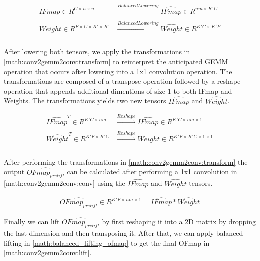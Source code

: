 \begin{equation}
    \begin{aligned}
        IFmap \in R^{C\times n\times n} & \xrightarrow[]{Balanced Lowering} \hat{IFmap} \in R^{nm\times K'C} \\
        Weight \in R^{F\times C\times K' \times K'} & \xrightarrow[]{Balanced Lowering} \hat{Weight} \in R^{K'C\times K'F} \\
    \end{aligned}
    \label{math:conv2gemm2conv:lowering}
\end{equation}

After lowering both tensors, we apply the transformations in
\autoref{math:conv2gemm2conv:transform} to reinterpret the anticipated GEMM
operation that occurs after lowering into a 1x1 convolution operation. The
transformations are composed of a transpose operation followed by a reshape
operation that appends additional dimentions of size 1 to both IFmap and
Weights. The transformations yields two new tensors $\hat{IFmap}$ and
$\hat{Weight}$.

\begin{equation}
    \begin{aligned}
        \hat{IFmap}^T \in R^{K'C \times nm} & \xrightarrow[]{Reshape} \hat{IFmap} \in R^{K'C \times nm \times 1} \\
        \hat{Weight}^T \in R^{K'F\times K'C} & \xrightarrow[]{Reshape} Weight \in R^{K'F\times K'C \times 1 \times 1} \\
        \end{aligned}
    \label{math:conv2gemm2conv:transform}
\end{equation}

After performing the transformations in \autoref{math:conv2gemm2conv:transform}
the output $\hat{OFmap_{prelift}}$ can be calculated after performing a 1x1
convolution in \autoref{math:conv2gemm2conv:conv} using the $\hat{IFmap}$ and
$\hat{Weight}$ tensors. 

\begin{equation}
    \begin{aligned}
        \hat{OFmap_{prelift}} \in R^{K'F\times nm \times 1} = \hat{IFmap}*\hat{Weight}
        \end{aligned}
    \label{math:conv2gemm2conv:conv}
\end{equation}

Finally we can lift $\hat{OFmap_{prelift}}$ by first reshaping it into a 2D
matrix by dropping the last dimension and then transposing it. After that, we
can apply balanced lifting in \autoref{math:balanced_lifting_ofmap} to get the
final OFmap in \autoref{math:conv2gemm2conv:lift}.

